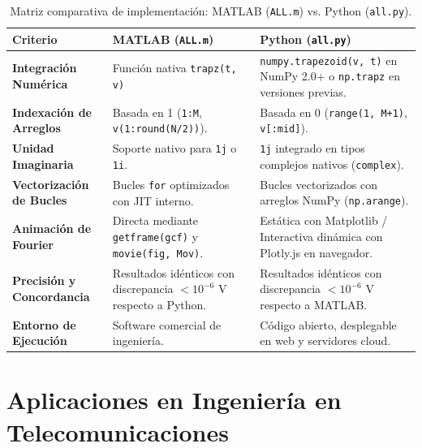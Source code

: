 \documentclass[11pt,a4paper]{article}
\begin{document}
\begin{table}[H]
\centering
\caption{Matriz comparativa de implementación: MATLAB (\texttt{ALL.m}) vs. Python (\texttt{all.py}).}
\label{tab:comp_matlab_python}
\begin{tabularx}{\textwidth}{p{3.8cm}X p{5.5cm}}
\toprule
\textbf{Criterio} & \textbf{MATLAB (\texttt{ALL.m})} & \textbf{Python (\texttt{all.py})} \\
\midrule
\textbf{Integración Numérica} & Función nativa \texttt{trapz(t, v)} & \texttt{numpy.trapezoid(v, t)} en NumPy 2.0+ o \texttt{np.trapz} en versiones previas. \\
\textbf{Indexación de Arreglos} & Basada en 1 (\texttt{1:M}, \texttt{v(1:round(N/2))}). & Basada en 0 (\texttt{range(1, M+1)}, \texttt{v[:mid]}). \\
\textbf{Unidad Imaginaria} & Soporte nativo para \texttt{1j} o \texttt{1i}. & \texttt{1j} integrado en tipos complejos nativos (\texttt{complex}). \\
\textbf{Vectorización de Bucles} & Bucles \texttt{for} optimizados con JIT interno. & Bucles vectorizados con arreglos NumPy (\texttt{np.arange}). \\
\textbf{Animación de Fourier} & Directa mediante \texttt{getframe(gcf)} y \texttt{movie(fig, Mov)}. & Estática con Matplotlib / Interactiva dinámica con Plotly.js en navegador. \\
\textbf{Precisión y Concordancia} & Resultados idénticos con discrepancia $< 10^{-6}\text{ V}$ respecto a Python. & Resultados idénticos con discrepancia $< 10^{-6}\text{ V}$ respecto a MATLAB. \\
\textbf{Entorno de Ejecución} & Software comercial de ingeniería. & Código abierto, desplegable en web y servidores cloud. \\
\bottomrule
\end{tabularx}
\end{table}

\section{Aplicaciones en Ingeniería en Telecomunicaciones}
\end{document}

